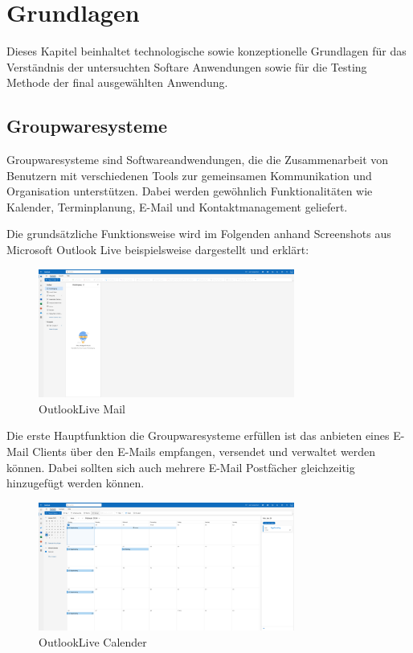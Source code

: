 \chapter{Grundlagen}

Dieses Kapitel beinhaltet technologische sowie konzeptionelle Grundlagen für das \\
Verständnis der untersuchten Softare Anwendungen sowie für die Testing Methode der final ausgewählten Anwendung.

\section{Groupwaresysteme}

Groupwaresysteme sind Softwareandwendungen, die die Zusammenarbeit von Benutzern mit verschiedenen Tools zur gemeinsamen Kommunikation und Organisation unterstützen.
Dabei werden gewöhnlich Funktionalitäten wie Kalender, Terminplanung, E-Mail und Kontaktmanagement geliefert.

Die grundsätzliche Funktionsweise wird im Folgenden anhand Screenshots aus Microsoft Outlook Live beispielsweise dargestellt und erklärt:

\begin{figure}[H]
    \centering
    \includegraphics[width=0.75\textwidth]{images/OutlookLive_Mail1.png}
    \caption{OutlookLive Mail}
    \label{fig:outlook-live-mail}
\end{figure}

Die erste Hauptfunktion die Groupwaresysteme erfüllen ist das anbieten eines E-Mail Clients  über den E-Mails empfangen, versendet und verwaltet werden können.
Dabei sollten sich auch mehrere E-Mail Postfächer gleichzeitig hinzugefügt werden können.


\begin{figure}[H]
    \centering
    \includegraphics[width=0.75\textwidth]{images/OutlookLive_Calender1.png}
    \caption{OutlookLive Calender}
    \label{fig:outlook-live-calender}
\end{figure}

